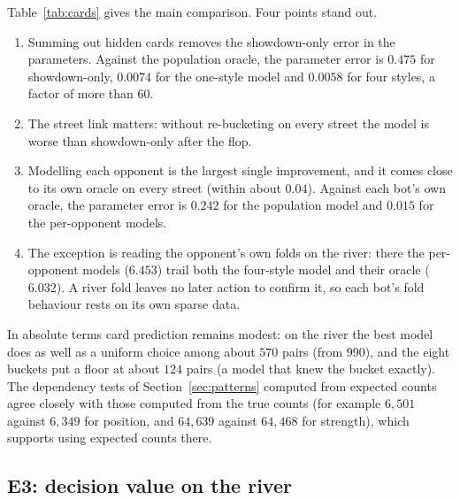 \documentclass[11pt,a4paper]{article}
\newcommand{\1}{\mathbf{1}}
\begin{document}
Table~\ref{tab:cards} gives the main comparison. Four points stand out.
\begin{enumerate}
  \item Summing out hidden cards removes the showdown-only error in the
        parameters. Against the population oracle, the parameter error is
        $0.475$ for showdown-only, $0.0074$ for the one-style model and $0.0058$
        for four styles, a factor of more than 60.
  \item The street link matters: without re-bucketing on every street the
        model is worse than showdown-only after the flop.
  \item Modelling each opponent is the largest single improvement, and it comes
        close to its own oracle on every street (within about $0.04$). Against each
        bot's own oracle, the parameter error is $0.242$ for the population
        model and $0.015$ for the per-opponent models.
  \item The exception is reading the opponent's own folds on the river: there
        the per-opponent models ($6.453$) trail both the four-style model and
        their oracle ($6.032$). A river fold leaves no later action to confirm
        it, so each bot's fold behaviour rests on its own sparse data.
\end{enumerate}
In absolute terms card prediction remains modest: on the river the best model
does as well as a uniform choice among about $570$ pairs (from $990$), and the
eight buckets put a floor at about $124$ pairs (a model that knew the bucket
exactly). The dependency tests of Section~\ref{sec:patterns} computed from
expected counts agree closely with those computed from the true counts (for
example $6{,}501$ against $6{,}349$ for position, and $64{,}639$ against
$64{,}468$ for strength), which supports using expected counts there.

\subsection{E3: decision value on the river}
\end{document}
